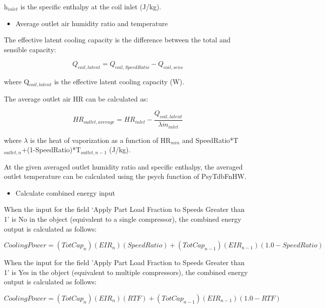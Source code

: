 h\(_{inlet}\) is the specific enthalpy at the coil inlet (J/kg).

\begin{itemize}
  \item Average outlet air humidity ratio and temperature
\end{itemize}

The effective latent cooling capacity is the difference between the total and sensible capacity:

\begin{equation}
{Q_{coil,latent}} = {Q_{coil,SpeedRatio}} - {Q_{coil,sens}}
\end{equation}

where Q\(_{coil,latent}\) is the effective latent cooling capacity (W).

The average outlet air HR can be calculated as:

\begin{equation}
  HR_{outlet,average} = HR_{inlet} - \frac{Q_{coil,latent}}{{\lambda} \dot{m}_{inlet}}
\end{equation}

where \(\lambda\) is the heat of vaporization as a function of HR\(_{min}\) and SpeedRatio*T\(_{outlet,n}\)+(1-SpeedRatio)*T\(_{outlet,n-1}\) (J/kg).

At the given averaged outlet humidity ratio and specific enthalpy, the averaged outlet temperature can be calculated using the psych function of PsyTdbFnHW.

\begin{itemize}
  \item Calculate combined energy input
\end{itemize}

When the input for the field `Apply Part Load Fraction to Speeds Greater than 1' is No in the object (equivalent to a single compressor), the combined energy output is calculated as follows:

\begin{equation}
CoolingPower = (TotCa{p_n})(EI{R_n})(SpeedRatio) + (TotCa{p_{n-1}})(EI{R_{n-1}})(1.0 - SpeedRatio)
\end{equation}

When the input for the field 'Apply Part Load Fraction to Speeds Greater than 1' is Yes in the object (equivalent to multiple compressors), the combined energy output is calculated as follows:

\begin{equation}
CoolingPower = (TotCa{p_n})(EI{R_n})(RTF) + (TotCa{p_{n - 1}})(EI{R_{n - 1}})(1.0 - RTF)
\end{equation}

